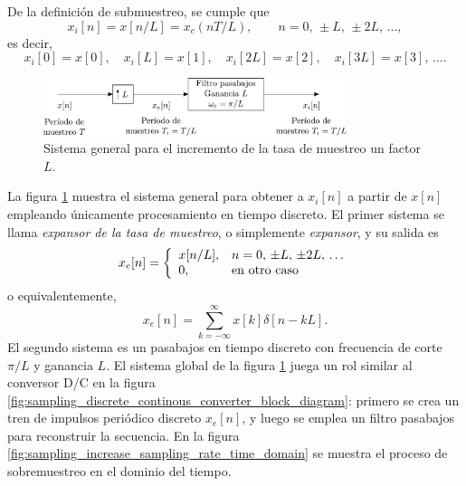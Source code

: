 \documentclass[a4paper]{report}
\begin{document}
De la definición de submuestreo, se cumple que
\[
 x_i[n]=x[n/L]=x_c(nT/L),\qquad n=0,\,\pm L,\,\pm 2L,\,\dots,
\]
es decir,
\[
x_i[0]=x[0],\quad x_i[L]=x[1],\quad x_i[2L]=x[2],\quad x_i[3L]=x[3],\,\dots.
\]
\begin{figure}[!htb]
 \begin{center}
 \includegraphics[width=0.79\textwidth]{figuras/sampling_expansor.pdf}
 \caption{\label{fig:sampling_expansor} Sistema general para el incremento de la tasa de muestreo un factor \(L\).}
 \end{center}
\end{figure}
La figura \ref{fig:sampling_expansor} muestra el sistema general para obtener a \(x_i[n]\) a partir de \(x[n]\) empleando únicamente procesamiento en tiempo discreto. El primer sistema se llama \emph{expansor de la tasa de muestreo}, o simplemente \emph{expansor}, y su salida es
\[
 x_e[n]=\left\{ 
  \begin{array}{l l}
   x[n/L], & n=0,\,\pm L,\,\pm 2L,\,\dots\\
   0, &\textrm{en otro caso}
   \end{array}\right.
\]
o equivalentemente,
\begin{equation}\label{eq:sampling_upsampling_expansor_output_xe}
 x_e[n]=\sum_{k=-\infty}^{\infty}x[k]\delta[n-kL]. 
\end{equation}
El segundo sistema es un pasabajos en tiempo discreto con frecuencia de corte \(\pi/L\) y ganancia \(L\). El sistema global de la figura \ref{fig:sampling_expansor} juega un rol similar al conversor D/C en la figura \ref{fig:sampling_discrete_continous_converter_block_diagram}: primero se crea un tren de impulsos periódico discreto \(x_e[n]\), y luego se emplea un filtro pasabajos para reconstruir la secuencia. En la figura \ref{fig:sampling_increase_sampling_rate_time_domain} se muestra el proceso de sobremuestreo en el dominio del tiempo.
\end{document}

